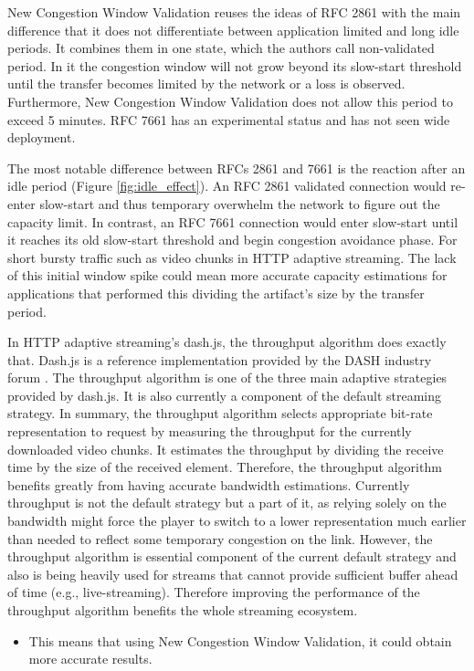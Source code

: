 \documentclass[10pt,sigconf]{acmart}
\begin{document}
New Congestion Window Validation reuses the ideas of RFC 2861 with the main difference that it does not differentiate between application limited and long idle periods. It combines them in one state, which the authors call non-validated period. In it the congestion window will not grow beyond its slow-start threshold until the transfer becomes limited by the network or a loss is observed. Furthermore, New Congestion Window Validation does not allow this period to exceed 5 minutes. RFC 7661 has an experimental status and has not seen wide deployment.

The most notable difference between RFCs 2861 and 7661 is the reaction after an idle period (Figure \ref{fig:idle_effect}). An RFC 2861 validated connection would re-enter slow-start and thus temporary overwhelm the network to figure out the capacity limit. In contrast, an RFC 7661 connection would enter slow-start until it reaches its old slow-start threshold and begin congestion avoidance phase. For short bursty traffic such as video chunks in HTTP adaptive streaming. The lack of this initial window spike could mean more accurate capacity estimations for applications that performed this dividing the artifact's size by the transfer period.

In HTTP adaptive streaming's dash.js, the throughput algorithm does exactly that. Dash.js is a reference implementation provided by the DASH industry forum \cite{online-dashif}. The throughput algorithm is one of the three main adaptive strategies provided by dash.js. It is also currently a component of the default streaming strategy. In summary, the throughput algorithm selects appropriate bit-rate representation to request by measuring the throughput for the currently downloaded video chunks. It estimates the throughput by dividing the receive time by the size of the received element. Therefore, the throughput algorithm benefits greatly from having accurate bandwidth estimations. Currently throughput is not the default strategy but a part of it, as relying solely on the bandwidth might force the player to switch to a lower representation much earlier than needed to reflect some temporary congestion on the link. However, the throughput algorithm is essential component of the current default strategy and also is being heavily used for streams that cannot provide sufficient buffer ahead of time (e.g., live-streaming). Therefore improving the performance of the throughput algorithm benefits the whole streaming ecosystem.

\begin{itemize}
    \item This means that using New Congestion Window Validation, it could obtain more accurate results.
\end{itemize}
\end{document}
